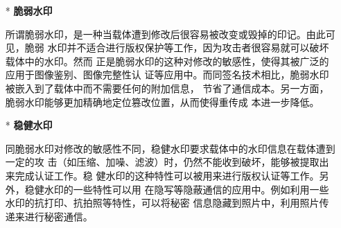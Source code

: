 \begin{itemize}
  \vspace{-10mm}
  \begin{itemize}
    \setlength{\parindent}{2em}
    \item[*] \textbf{脆弱水印}
    \vspace{-1mm}
    \par
    所谓脆弱水印，是一种当载体遭到修改后很容易被改变或毁掉的印记。由此可见，脆弱
    水印并不适合进行版权保护等工作，因为攻击者很容易就可以破坏载体中的水印。然而
    正是脆弱水印的这种对修改的敏感性，使得其被广泛的应用于图像鉴别、图像完整性认
    证等应用中。而同签名技术相比，脆弱水印被嵌入到了载体中而不需要任何的附加信息，
    节省了通信成本。另一方面，脆弱水印能够更加精确地定位篡改位置，从而使得重传成
    本进一步降低。
    \par
    \vspace{-2mm}
    \item[*] \textbf{稳健水印}
    \vspace{-1mm}
    \par
    同脆弱水印对修改的敏感性不同，稳健水印要求载体中的水印信息在载体遭到一定的攻
    击（如压缩、加噪、滤波）时，仍然不能收到破坏，能够被提取出来完成认证工作。稳
    健水印的这种特性可以被用来进行版权认证等工作。另外，稳健水印的一些特性可以用
    在隐写等隐蔽通信的应用中。例如利用一些水印的抗打印、抗拍照等特性，可以将秘密
    信息隐藏到照片中，利用照片传递来进行秘密通信。\\
  \end{itemize}
\end{itemize}



